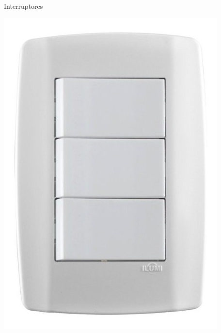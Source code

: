 \begin{frame}{Interruptores}
\begin{minipage}{0.3\linewidth}
	\end{minipage}\hfill
	\begin{minipage}{0.3\linewidth}
		\centering
		\includegraphics[height=0.5\textheight]{Figuras/Ch08/fig3}
	\end{minipage}

\end{frame}


